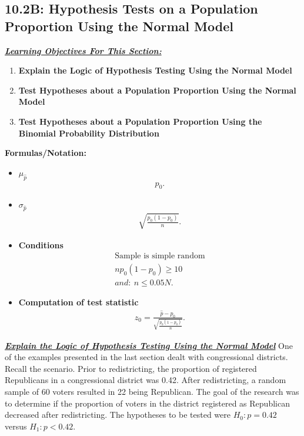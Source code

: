 \documentclass{report}
\begin{document}
    \subsection*{10.2B: Hypothesis Tests on a Population Proportion Using the Normal Model}
    \bigbreak \noindent 
    \bigbreak \noindent 
    \textbf{\textit{\underline{Learning Objectives For This Section:}}}
    \begin{enumerate}
        \item \textbf{Explain the Logic of Hypothesis Testing Using the Normal Model}
        \item \textbf{Test Hypotheses about a Population Proportion Using the Normal Model}
        \item \textbf{Test Hypotheses about a Population Proportion Using the Binomial Probability Distribution}
    \end{enumerate}
    \bigbreak \noindent 
    \textbf{Formulas/Notation:}
    \begin{itemize}
        \item \textbf{$\mu_{\hat{p}}$}
            \begin{align*}
                p_{0}
            .\end{align*}
        \item \textbf{$\sigma_{\hat{p}} $}
            \begin{align*}
                \sqrt{\frac{p_{0}(1-p_{0})}{n}}
            .\end{align*}
        \item \textbf{Conditions}
            \begin{align*}
                \text{Sample is simple random} \\
                np_{0}(1-p_{0}) \geq 10 \\
                and:\ n \leq 0.05N
            .\end{align*}
        \item \textbf{Computation of test statistic}
            \begin{align*}
                z_{0} = \frac{\hat{p}-p_{0}}{\sqrt{\frac{p_{0}(1-p_{0})}{n}}}
            .\end{align*}
    \end{itemize}
    \bigbreak \noindent \bigbreak \noindent 
    \textbf{\textit{\underline{Explain the Logic of Hypothesis Testing Using the Normal Model}}}
    \bigbreak \noindent 
    One of the examples presented in the last section dealt with congressional districts. Recall the scenario. Prior to redistricting, the proportion of registered Republicans in a congressional district was 0.42. After redistricting, a random sample of 60 voters resulted in 22 being Republican. The goal of the research was to determine if the proportion of voters in the district registered as Republican decreased after redistricting. The hypotheses to be tested were $H_0: p=0.42$ versus $H_1: p<0.42$.
\end{document}
